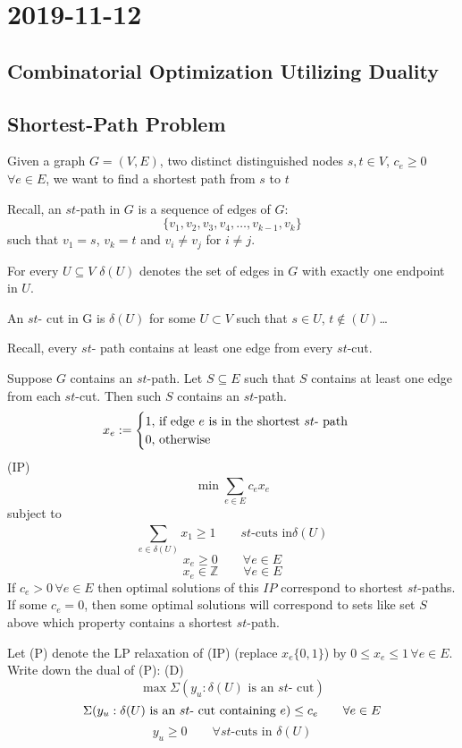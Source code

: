 \section{2019-11-12}
\subsection{Combinatorial Optimization Utilizing Duality}
\subsection{Shortest-Path Problem}
Given a graph $ G=(V,E) $, two distinct distinguished nodes $ s,t\in V $,
$ c_e\ge 0 $ $ \forall e\in E $, we want to find a shortest path from $s$ to $t$

Recall, an $ st $-path in $ G $ is a sequence of edges of $ G $:
\[ \{v_1,v_2,v_3,v_4,\ldots,v_{k-1},v_k\} \]
such that $ v_1=s $, $ v_k=t $ and $ v_i\neq v_j $ for $ i\neq j $.

For every $ U\subseteq V $ $ \delta(U) $ denotes the set of edges in
$ G $ with exactly one endpoint in $ U $.

An $ st $- cut in G is $ \delta(U) $ for some $ U\subset V $ such that
$ s\in U $, $ t\notin(U) $\ldots 

Recall, every $ st $- path contains at least one edge from every $ st $-cut. 

Suppose $ G $ contains an $ st $-path. Let $ S\subseteq E $ such that
$ S $ contains at least one edge from each $ st $-cut. Then such $ S $
contains an $ st $-path.
\[ x_e:=
\begin{cases}
    1,\,\text{if edge $e$ is in the shortest $ st $- path}\\
    0,\,\text{otherwise}
\end{cases} \]
(IP) \[ \min \sum\limits_{e\in E}^{} c_ex_e \]
subject to
\[ \sum\limits_{e\in\delta(U)}^{} x_1\ge 1 \qquad st \text{-cuts in}  \delta(U)\]
\[ x_e\ge 0 \qquad \forall e\in E\]
\[ x_e\in \mathbb{Z} \qquad \forall e\in E\]
If $ c_e>0\, \forall e\in E$ then optimal solutions of this $ IP $ correspond to
shortest $ st $-paths. If some $ c_e=0 $, then some optimal solutions will
correspond to sets like set $ S $ above which property contains a shortest $st$-path.

Let (P) denote the LP relaxation of (IP) (replace $ x_e \{0,1\} $) by
$ 0\le x_e\le 1\, \forall e\in E $. Write down the dual of (P):
(D)
\[ \max \Sigma(y_u:\delta(U)\text{ is an $st$- cut})  \]
\[ \Sigma(y_u:\delta(U)\text{ is an $st$- cut containing $ e $})\le c_e \qquad \forall e\in E \]
\[ y_u\ge 0\qquad \forall st \text{-cuts in }\delta(U) \]

